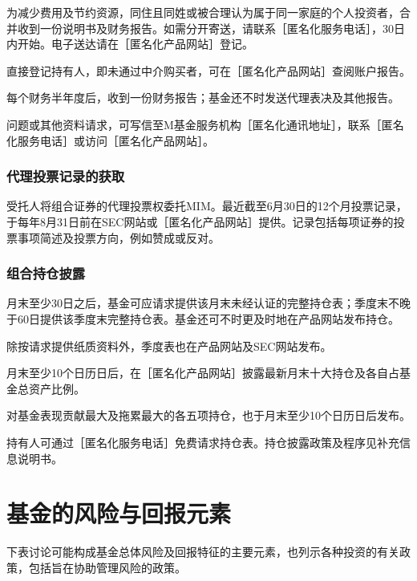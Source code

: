 \documentclass[UTF8,fontset=none,11pt,a4paper]{ctexart}
\begin{document}
为减少费用及节约资源，同住且同姓或被合理认为属于同一家庭的个人投资者，合并收到一份说明书及财务报告。如需分开寄送，请联系［匿名化服务电话］，30日内开始。电子送达请在［匿名化产品网站］登记。

直接登记持有人，即未通过中介购买者，可在［匿名化产品网站］查阅账户报告。

每个财务半年度后，收到一份财务报告；基金还不时发送代理表决及其他报告。

问题或其他资料请求，可写信至M基金服务机构［匿名化通讯地址］，联系［匿名化服务电话］或访问［匿名化产品网站］。

\subsubsection*{代理投票记录的获取}\label{unitU827}
受托人将组合证券的代理投票权委托MIM。最近截至6月30日的12个月投票记录，于每年8月31日前在SEC网站或［匿名化产品网站］提供。记录包括每项证券的投票事项简述及投票方向，例如赞成或反对。

\subsubsection*{组合持仓披露}\label{unitU829}
月末至少30日之后，基金可应请求提供该月末未经认证的完整持仓表；季度末不晚于60日提供该季度末完整持仓表。基金还可不时更及时地在产品网站发布持仓。

除按请求提供纸质资料外，季度表也在产品网站及SEC网站发布。

月末至少10个日历日后，在［匿名化产品网站］披露最新月末十大持仓及各自占基金总资产比例。

对基金表现贡献最大及拖累最大的各五项持仓，也于月末至少10个日历日后发布。

持有人可通过［匿名化服务电话］免费请求持仓表。持仓披露政策及程序见补充信息说明书。


\par{}\label{originalpage23}
\section*{基金的风险与回报元素}\label{unitU837}
下表讨论可能构成基金总体风险及回报特征的主要元素，也列示各种投资的有关政策，包括旨在协助管理风险的政策。
\end{document}
